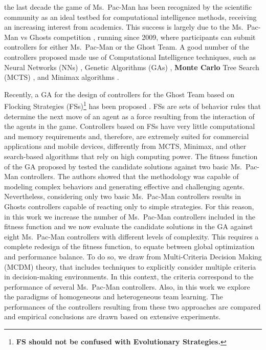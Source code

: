 \documentclass[journal]{IEEEtran}
\begin{document}
 the last decade the game of Ms.\  Pac-Man has been recognized by the scientific community as an ideal testbed for computational intelligence methods, receiving an increasing interest from academics. This success is largely due to the Ms.\  Pac-Man vs Ghosts competition \cite{Lucas2009,MsPacManVSGhost2011}, running since 2009, where participants can submit controllers for either Ms.\  Pac-Man or the Ghost Team. A good number of the controllers proposed made use of Computational Intelligence techniques, such as Neural Networks (NNs) \cite{Rojas1996}, Genetic Algorithms (GAs) \cite{Goldberg1988}, \textbf{Monte Carlo} Tree Search (MCTS) \cite{Browne2012}, and Minimax algorithms \cite{Osborne1994}.

Recently, a GA for the design of controllers for the Ghost Team based on Flocking Strategies (FSs)\footnote{\textbf{FS should not be confused with Evolutionary Strategies.}} has been proposed \cite{Liberatore2014}. FSs are sets of behavior rules that determine the next move of an agent as a force resulting from the interaction of the agents in the game. Controllers based on FSs have very little computational and memory requirements and, therefore, are extremely suited for commercial applications and mobile devices, differently from MCTS, Minimax, and other search-based algorithms that rely on high computing power. The fitness function of the GA proposed by \cite{Liberatore2014} tested the candidate solutions against two basic Ms.\  Pac-Man controllers. The authors showed that the methodology was capable of modeling complex behaviors and generating effective and challenging agents. Nevertheless, considering only two basic Ms.\  Pac-Man controllers results in Ghosts controllers capable of reacting only to simple strategies. For this reason, in this work we increase the number of Ms.\  Pac-Man controllers included in the fitness function and we now evaluate the candidate solutions in the GA against eight Ms.\  Pac-Man controllers with different levels of complexity. This requires a complete redesign of the fitness function, to equate between global optimization and performance balance. To do so, we draw from Multi-Criteria Decision Making (MCDM) theory, that includes techniques to explicitly consider multiple criteria in decision-making environments. In this context, the criteria correspond to the performance of several Ms.\  Pac-Man controllers.  Also, in this work we explore the paradigms of homogeneous and heterogeneous team learning. The performances of the controllers resulting from these two approaches are compared and empirical conclusions are drawn based on extensive experiments. 
\end{document}
